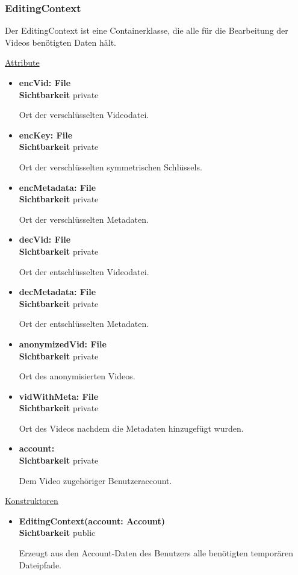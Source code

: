 \subsubsection{EditingContext} \label{service:klasse:EditingContext}
Der EditingContext ist eine Containerklasse, die alle für die Bearbeitung der Videos benötigten Daten hält. \newline

\underline{Attribute}
\begin{itemize}
\itemsep0pt
\item \textbf{encVid: File} \hfill\\ 
\textbf{Sichtbarkeit} private

Ort der verschlüsselten Videodatei.

\item \textbf{encKey: File} \hfill\\ 
\textbf{Sichtbarkeit} private

Ort der verschlüsselten symmetrischen Schlüssels.

\item \textbf{encMetadata: File} \hfill\\
\textbf{Sichtbarkeit} private
 
Ort der verschlüsselten Metadaten.

\item \textbf{decVid: File} \hfill\\ 
\textbf{Sichtbarkeit} private

Ort der entschlüsselten Videodatei.

\item \textbf{decMetadata: File} \hfill\\ 
\textbf{Sichtbarkeit} private

Ort der entschlüsselten Metadaten.

\item \textbf{anonymizedVid: File} \hfill\\ 
\textbf{Sichtbarkeit} private

Ort des anonymisierten Videos.

\item \textbf{vidWithMeta: File} \hfill\\ 
\textbf{Sichtbarkeit} private

Ort des Videos nachdem die Metadaten hinzugefügt wurden.

\item \textbf{account: } \hfill\\ 
\textbf{Sichtbarkeit} private

Dem Video zugehöriger Benutzeraccount.
\end{itemize}

\underline{Konstruktoren}
\begin{itemize}
\itemsep0pt
\item \textbf{EditingContext(account: Account)} \hfill\\
\textbf{Sichtbarkeit} public

Erzeugt aus den Account-Daten des Benutzers alle benötigten temporären Dateipfade.
\end{itemize}